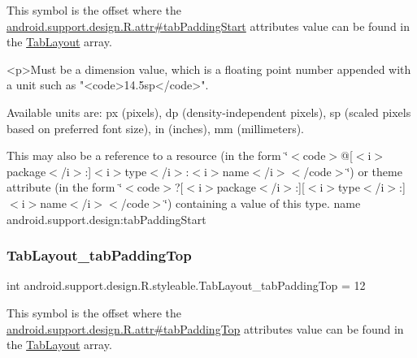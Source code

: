 This symbol is the offset where the \hyperlink{classandroid_1_1support_1_1design_1_1R_1_1attr_aff6098bfa08bb8d7dbaafe9d1ef8feb6}{android.\+support.\+design.\+R.\+attr\#tab\+Padding\+Start} attribute\textquotesingle{}s value can be found in the \hyperlink{classandroid_1_1support_1_1design_1_1R_1_1styleable_a514b47b47f600f9421b65f4f0aa832d6}{Tab\+Layout} array.

\begin{DoxyVerb}      <p>Must be a dimension value, which is a floating point number appended with a unit such as "<code>14.5sp</code>".
\end{DoxyVerb}
 Available units are\+: px (pixels), dp (density-\/independent pixels), sp (scaled pixels based on preferred font size), in (inches), mm (millimeters). 

This may also be a reference to a resource (in the form \char`\"{}$<$code$>$@\mbox{[}$<$i$>$package$<$/i$>$\+:\mbox{]}$<$i$>$type$<$/i$>$\+:$<$i$>$name$<$/i$>$$<$/code$>$\char`\"{}) or theme attribute (in the form \char`\"{}$<$code$>$?\mbox{[}$<$i$>$package$<$/i$>$\+:\mbox{]}\mbox{[}$<$i$>$type$<$/i$>$\+:\mbox{]}$<$i$>$name$<$/i$>$$<$/code$>$\char`\"{}) containing a value of this type.  name android.\+support.\+design\+:tab\+Padding\+Start \mbox{\label{classandroid_1_1support_1_1design_1_1R_1_1styleable_a266ce11736ecf5a362936eddab89acd3}} 
\subsubsection{\texorpdfstring{Tab\+Layout\+\_\+tab\+Padding\+Top}{TabLayout\_tabPaddingTop}}
{\footnotesize\ttfamily int android.\+support.\+design.\+R.\+styleable.\+Tab\+Layout\+\_\+tab\+Padding\+Top = 12\hspace{0.3cm}{\ttfamily [static]}}

This symbol is the offset where the \hyperlink{classandroid_1_1support_1_1design_1_1R_1_1attr_a0a45c9281015bec36a61c5dc4cdaa0b5}{android.\+support.\+design.\+R.\+attr\#tab\+Padding\+Top} attribute\textquotesingle{}s value can be found in the \hyperlink{classandroid_1_1support_1_1design_1_1R_1_1styleable_a514b47b47f600f9421b65f4f0aa832d6}{Tab\+Layout} array.


